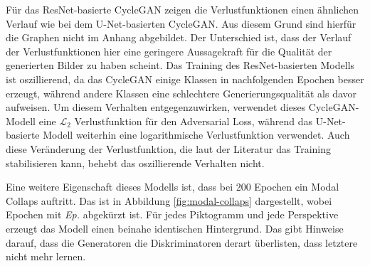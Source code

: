 Für das ResNet-basierte \ac{CycleGAN} zeigen die Verlustfunktionen einen ähnlichen Verlauf wie bei dem U-Net-basierten \ac{CycleGAN}. Aus diesem Grund sind hierfür die Graphen nicht im Anhang abgebildet. Der Unterschied ist, dass der Verlauf der Verlustfunktionen hier eine geringere Aussagekraft für die Qualität der generierten Bilder zu haben scheint. Das Training des ResNet-basierten Modells ist oszillierend, da das \ac{CycleGAN} einige Klassen in nachfolgenden Epochen besser erzeugt, während andere Klassen eine schlechtere Generierungsqualität als davor aufweisen. Um diesem Verhalten entgegenzuwirken, verwendet dieses \ac{CycleGAN}-Modell eine $\mathcal{L}_2$ Verlustfunktion für den Adversarial Loss, während das U-Net-basierte Modell weiterhin eine logarithmische Verlustfunktion verwendet. Auch diese Veränderung der Verlustfunktion, die laut der Literatur das Training stabilisieren kann, behebt das oszillierende Verhalten nicht.

Eine weitere Eigenschaft dieses Modells ist, dass bei 200 Epochen ein Modal Collaps auftritt. Das ist in Abbildung \ref{fig:modal-collaps} dargestellt, wobei Epochen mit \emph{Ep.} abgekürzt ist. Für jedes Piktogramm und jede Perspektive erzeugt das Modell einen beinahe identischen Hintergrund. Das gibt Hinweise darauf, dass die Generatoren die Diskriminatoren derart überlisten, dass letztere nicht mehr lernen.

